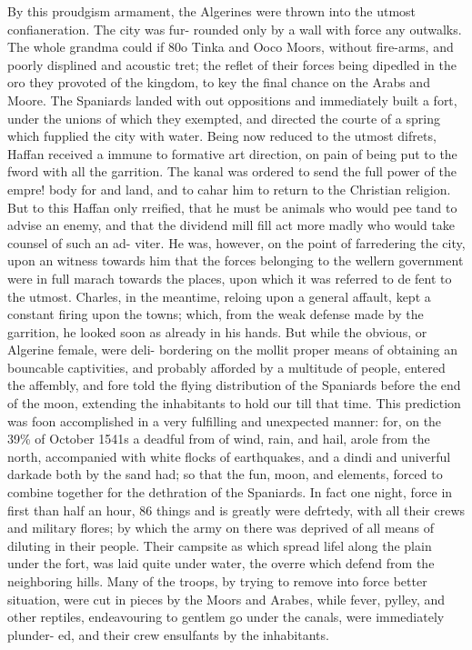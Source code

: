 \documentclass{article}
\begin{document}
By this proudgism armament, the Algerines were thrown into the utmost confianeration. The city was fur- rounded only by a wall with force any outwalks. The whole grandma could if 80o Tinka and Ooco Moors, without fire-arms, and poorly displined and acoustic tret; the reflet of their forces being dipedled in the oro they provoted of the kingdom, to key the final chance on the Arabs and Moore. The Spaniards landed with out oppositions and immediately built a fort, under the unions of which they exempted, and directed the courte of a spring which fupplied the city with water. Being now reduced to the utmost difrets, Haffan received a immune to formative art direction, on pain of being put to the fword with all the garrition. The kanal was ordered to send the full power of the empre! body for and land, and to cahar him to return to the Christian religion. But to this Haffan only rreified, that he must be animals who would pee tand to advise an enemy, and that the dividend mill fill act more madly who would take counsel of such an ad- viter. He was, however, on the point of farredering the city, upon an witness towards him that the forces belonging to the wellern government were in full marach towards the places, upon which it was referred to de fent to the utmost. Charles, in the meantime, reloing upon a general affault, kept a constant firing upon the towns; which, from the weak defense made by the garrition, he looked soon as already in his hands. But while the obvious, or Algerine female, were deli- bordering on the mollit proper means of obtaining an bouncable captivities, and probably afforded by a multitude of people, entered the affembly, and fore told the flying distribution of the Spaniards before the end of the moon, extending the inhabitants to hold our till that time. This prediction was foon accomplished in a very fulfilling and unexpected manner: for, on the 39\% of October 1541s a deadful from of wind, rain, and hail, arole from the north, accompanied with white flocks of earthquakes, and a dindi and univerful darkade both by the sand had; so that the fun, moon, and elements, forced to combine together for the dethration of the Spaniards. In fact one night, force in first than half an hour, 86 things and is greatly were defrtedy, with all their crews and military flores; by which the army on there was deprived of all means of diluting in their people. Their campsite as which spread lifel along the plain under the fort, was laid quite under water, the overre which defend from the neighboring hills. Many of the troops, by trying to remove into force better situation, were cut in pieces by the Moors and Arabes, while fever, pylley, and other reptiles, endeavouring to gentlem go under the canals, were immediately plunder- ed, and their crew ensulfants by the inhabitants.
\end{document}
